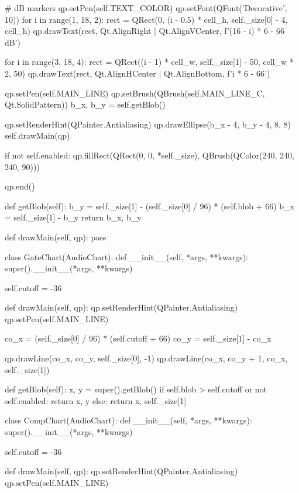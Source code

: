 \begin{pythoncode}
        # dB markers
        qp.setPen(self.TEXT_COLOR)
        qp.setFont(QFont('Decorative', 10))
        for i in range(1, 18, 2):
            rect = QRect(0, (i - 0.5) * cell_h, self._size[0] - 4, cell_h)
            qp.drawText(rect, Qt.AlignRight | Qt.AlignVCenter, f'{(16 - i) * 6 - 66} dB')

        for i in range(3, 18, 4):
            rect = QRect((i - 1) * cell_w, self._size[1] - 50, cell_w * 2, 50)
            qp.drawText(rect, Qt.AlignHCenter | Qt.AlignBottom, f'{i * 6 - 66}')

        qp.setPen(self.MAIN_LINE)
        qp.setBrush(QBrush(self.MAIN_LINE_C, Qt.SolidPattern))
        b_x, b_y = self.getBlob()

        qp.setRenderHint(QPainter.Antialiasing)
        qp.drawEllipse(b_x - 4, b_y - 4, 8, 8)
        self.drawMain(qp)

        if not self.enabled:
            qp.fillRect(QRect(0, 0, *self._size), QBrush(QColor(240, 240, 240, 90)))

        qp.end()

    def getBlob(self):
        b_y = self._size[1] - (self._size[0] / 96) * (self.blob + 66)
        b_x = self._size[1] - b_y
        return b_x, b_y

    def drawMain(self, qp):
        pass


class GateChart(AudioChart):
    def __init__(self, *args, **kwargs):
        super().__init__(*args, **kwargs)

        self.cutoff = -36

    def drawMain(self, qp):
        qp.setRenderHint(QPainter.Antialiasing)
        qp.setPen(self.MAIN_LINE)

        co_x = (self._size[0] / 96) * (self.cutoff + 66)
        co_y = self._size[1] - co_x

        qp.drawLine(co_x, co_y, self._size[0], -1)
        qp.drawLine(co_x, co_y + 1, co_x, self._size[1])

    def getBlob(self):
        x, y = super().getBlob()
        if self.blob > self.cutoff or not self.enabled:
            return x, y
        else:
            return x, self._size[1]


class CompChart(AudioChart):
    def __init__(self, *args, **kwargs):
        super().__init__(*args, **kwargs)

        self.cutoff = -36

    def drawMain(self, qp):
        qp.setRenderHint(QPainter.Antialiasing)
        qp.setPen(self.MAIN_LINE)


\end{pythoncode}

